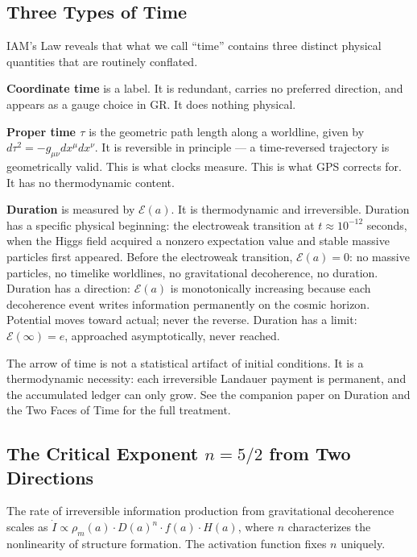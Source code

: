\documentclass[12pt,a4paper]{article}
\begin{document}
\subsection{Three Types of Time}

IAM's Law reveals that what we call ``time'' contains three distinct physical
quantities that are routinely conflated.

\textbf{Coordinate time} is a label. It is redundant, carries no preferred
direction, and appears as a gauge choice in GR. It does nothing physical.

\textbf{Proper time $\tau$} is the geometric path length along a worldline,
given by $d\tau^2 = -g_{\mu\nu}dx^\mu dx^\nu$. It is reversible in principle
--- a time-reversed trajectory is geometrically valid. This is what clocks
measure. This is what GPS corrects for. It has no thermodynamic content.

\textbf{Duration} is measured by $\mathcal{E}(a)$. It is thermodynamic and
irreversible. Duration has a specific physical beginning: the electroweak
transition at $t \approx 10^{-12}$ seconds, when the Higgs field acquired a
nonzero expectation value and stable massive particles first appeared.
Before the electroweak transition, $\mathcal{E}(a) = 0$: no massive particles,
no timelike worldlines, no gravitational decoherence, no duration.
Duration has a direction: $\mathcal{E}(a)$ is monotonically increasing because
each decoherence event writes information permanently on the cosmic horizon.
Potential moves toward actual; never the reverse. Duration has a limit:
$\mathcal{E}(\infty) = e$, approached asymptotically, never reached.

The arrow of time is not a statistical artifact of initial conditions. It is a
thermodynamic necessity: each irreversible Landauer payment is permanent, and
the accumulated ledger can only grow. See the companion paper on Duration and
the Two Faces of Time for the full treatment.

\subsection{The Critical Exponent $n = 5/2$ from Two Directions}
\label{sec:n52}

The rate of irreversible information production from gravitational decoherence
scales as $\dot{I} \propto \rho_m(a) \cdot D(a)^n \cdot f(a) \cdot H(a)$,
where $n$ characterizes the nonlinearity of structure formation. The
activation function fixes $n$ uniquely.
\end{document}
